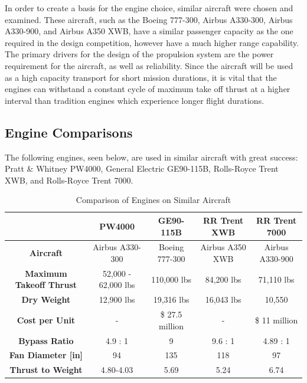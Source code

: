 


In order to create a basis for the engine choice, similar aircraft were chosen and examined. These aircraft, such as the Boeing 777-300, Airbus A330-300, Airbus A330-900, and Airbus A350 XWB, have a similar passenger capacity as the one required in the design competition, however have a much higher range capability. The primary drivers for the design of the propulsion system are the power requirement for the aircraft, as well as reliability. Since the aircraft will be used as a high capacity transport for short mission durations, it is vital that the engines can withstand a constant cycle of maximum take off thrust at a higher interval than tradition engines which experience longer flight durations. 

\subsection{Engine Comparisons}

The following engines, seen below, are used in similar aircraft with great success: Pratt \& Whitney PW4000, General Electric GE90-115B, Rolls-Royce Trent XWB, and Rolls-Royce Trent 7000.

\begin{table}[!h]
    \centering
        \caption{Comparison of Engines on Similar Aircraft}
    \begin{tabular}{|c||c|c|c|c|}\toprule
         & \textbf{PW4000} & \textbf{GE90-115B} & \textbf{RR Trent XWB} & \textbf{RR Trent 7000} \\\hline \hline
         \textbf{Aircraft} & Airbus A330-300 & Boeing 777-300 & Airbus A350 XWB & Airbus A330-900\\ \hline
         \textbf{Maximum Takeoff Thrust} & 52,000 - 62,000 lbs \cite{PW} & 110,000 lbs \cite{ge90} & 84,200 lbs \cite{xwb} & 71,110 lbs \cite{butterworth}\\ \hline
         \textbf{Dry Weight} & 12,900 lbs \cite{FAApw} & 19,316 lbs \cite{ge90} & 16,043 lbs \cite{xwb2} & 10,550 \cite{butterworth} \\ \hline
         \textbf{Cost per Unit} & - & \$ 27.5 million \cite{gecost} & - & \$ 11 million \cite{butterworth} \\ \hline
         \textbf{Bypass Ratio} & 4.9 \cite{PW} : 1 \cite{PW} & 9 \cite{safran} & 9.6 : 1 \cite{xwb} & 4.89 : 1 \cite{butterworth} \\ \hline
         \textbf{Fan Diameter [in]} & 94 \cite{PW} & 135 \cite{ge} & 118 \cite{xwb} &  97 \cite{butterworth}\\ \hline
         \textbf{Thrust to Weight} & 4.80-4.03 & 5.69 & 5.24 & 6.74 \\ \bottomrule
    \end{tabular}
    \label{tab:enginecomp}
\end{table}

